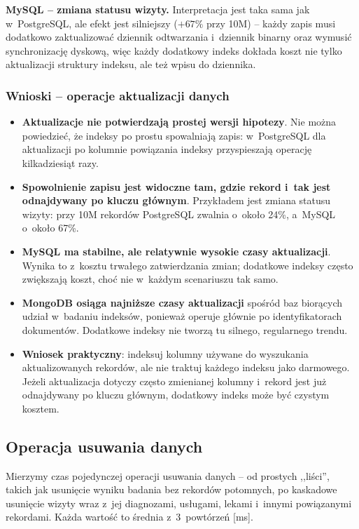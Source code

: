 \documentclass[12pt,a4paper]{article}
\begin{document}
\textbf{MySQL -- zmiana statusu wizyty.} Interpretacja jest taka sama jak w~PostgreSQL, ale efekt jest silniejszy ($+67\%$ przy 10M) -- każdy zapis musi dodatkowo zaktualizować dziennik odtwarzania i~dziennik binarny oraz wymusić synchronizację dyskową, więc każdy dodatkowy indeks dokłada koszt nie tylko aktualizacji struktury indeksu, ale też wpisu do dziennika.

\subsubsection*{Wnioski -- operacje aktualizacji danych}

\begin{itemize}[noitemsep]
    \item \textbf{Aktualizacje nie potwierdzają prostej wersji hipotezy}. Nie można powiedzieć, że indeksy po prostu spowalniają zapis: w~PostgreSQL dla aktualizacji po kolumnie powiązania indeksy przyspieszają operację kilkadziesiąt razy.
    \item \textbf{Spowolnienie zapisu jest widoczne tam, gdzie rekord i~tak jest odnajdywany po kluczu głównym}. Przykładem jest zmiana statusu wizyty: przy 10M rekordów PostgreSQL zwalnia o~około 24\%, a~MySQL o~około 67\%.
    \item \textbf{MySQL ma stabilne, ale relatywnie wysokie czasy aktualizacji}. Wynika to z~kosztu trwałego zatwierdzania zmian; dodatkowe indeksy często zwiększają koszt, choć nie w~każdym scenariuszu tak samo.
    \item \textbf{MongoDB osiąga najniższe czasy aktualizacji} spośród baz biorących udział w~badaniu indeksów, ponieważ operuje głównie po identyfikatorach dokumentów. Dodatkowe indeksy nie tworzą tu silnego, regularnego trendu.
    \item \textbf{Wniosek praktyczny}: indeksuj kolumny używane do wyszukania aktualizowanych rekordów, ale nie traktuj każdego indeksu jako darmowego. Jeżeli aktualizacja dotyczy często zmienianej kolumny i~rekord jest już odnajdywany po kluczu głównym, dodatkowy indeks może być czystym kosztem.
\end{itemize}

\subsection{Operacja usuwania danych}
\label{sec:res_delete}

Mierzymy czas pojedynczej operacji usuwania danych -- od prostych ,,liści'', takich jak usunięcie wyniku badania bez rekordów potomnych, po kaskadowe usunięcie wizyty wraz z~jej diagnozami, usługami, lekami i~innymi powiązanymi rekordami. Każda wartość to średnia z~3~powtórzeń [ms].
\end{document}
